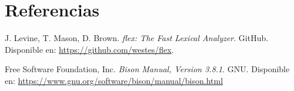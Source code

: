 \documentclass{article}
\begin{document}
\section{Referencias}
\renewcommand{\refname}{}

\begin{thebibliography}{9}

 \label{ref:vidIntro}  J. Levine, T. Mason, D. Brown. \textit{flex: The Fast Lexical Analyzer}. GitHub. Disponible en: \url{https://github.com/westes/flex}.

 \label{ref:vidTelepor}  Free Software Foundation, Inc. \textit{Bison Manual, Version 3.8.1}. GNU. Disponible en: \url{https://www.gnu.org/software/bison/manual/bison.html}

\end{thebibliography}
\end{document}
